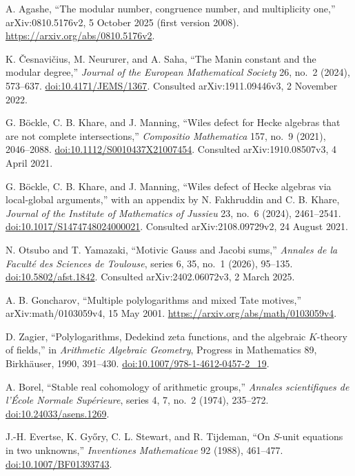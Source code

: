 A. Agashe,
``The modular number, congruence number, and multiplicity one,''
arXiv:0810.5176v2, 5 October 2025 (first version 2008).
\url{https://arxiv.org/abs/0810.5176v2}.

K. \v{C}esnavi\v{c}ius, M. Neururer, and A. Saha,
``The Manin constant and the modular degree,''
\emph{Journal of the European Mathematical Society} 26, no.~2 (2024), 573--637.
\href{https://doi.org/10.4171/JEMS/1367}{doi:10.4171/JEMS/1367}.
Consulted arXiv:1911.09446v3, 2 November 2022.

G. B\"ockle, C. B. Khare, and J. Manning,
``Wiles defect for Hecke algebras that are not complete intersections,''
\emph{Compositio Mathematica} 157, no.~9 (2021), 2046--2088.
\href{https://doi.org/10.1112/S0010437X21007454}{doi:10.1112/S0010437X21007454}.
Consulted arXiv:1910.08507v3, 4 April 2021.

G. B\"ockle, C. B. Khare, and J. Manning,
``Wiles defect of Hecke algebras via local-global arguments,''
with an appendix by N. Fakhruddin and C. B. Khare,
\emph{Journal of the Institute of Mathematics of Jussieu} 23, no.~6 (2024), 2461--2541.
\href{https://doi.org/10.1017/S1474748024000021}{doi:10.1017/S1474748024000021}.
Consulted arXiv:2108.09729v2, 24 August 2021.

N. Otsubo and T. Yamazaki,
``Motivic Gauss and Jacobi sums,''
\emph{Annales de la Facult\'e des Sciences de Toulouse}, series 6,
35, no.~1 (2026), 95--135.
\href{https://doi.org/10.5802/afst.1842}{doi:10.5802/afst.1842}.
Consulted arXiv:2402.06072v3, 2 March 2025.

A. B. Goncharov,
``Multiple polylogarithms and mixed Tate motives,''
arXiv:math/0103059v4, 15 May 2001.
\url{https://arxiv.org/abs/math/0103059v4}.

D. Zagier,
``Polylogarithms, Dedekind zeta functions, and the algebraic $K$-theory of fields,''
in \emph{Arithmetic Algebraic Geometry}, Progress in Mathematics 89,
Birkh\"auser, 1990, 391--430.
\href{https://doi.org/10.1007/978-1-4612-0457-2_19}{doi:10.1007/978-1-4612-0457-2\_19}.

A. Borel,
``Stable real cohomology of arithmetic groups,''
\emph{Annales scientifiques de l'\'Ecole Normale Sup\'erieure}, series 4,
7, no.~2 (1974), 235--272.
\href{https://doi.org/10.24033/asens.1269}{doi:10.24033/asens.1269}.

J.-H. Evertse, K. Gy\H{o}ry, C. L. Stewart, and R. Tijdeman,
``On $S$-unit equations in two unknowns,''
\emph{Inventiones Mathematicae} 92 (1988), 461--477.
\href{https://doi.org/10.1007/BF01393743}{doi:10.1007/BF01393743}.
